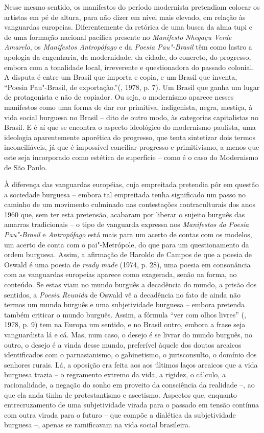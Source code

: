 Nesse mesmo sentido, os manifestos do período modernista pretendiam
colocar os artistas em pé de altura, para não dizer em nível mais
elevado, em relação às vanguardas europeias. Diferentemente da retórica
de uma busca da alma tupi e de uma formação nacional pacífica presente
no \emph{Manifesto} \emph{Nhegaçu Verde Amarelo}, os \emph{Manifestos
Antropófago} e da \emph{Poesia Pau"-Brasil} têm como lastro a apologia da
engenharia, da modernidade, da cidade, do concreto, do progresso, embora
com a tonalidade local, irreverente e questionadora do passado colonial.
A disputa é entre um Brasil que importa e copia, e um Brasil que
inventa, ``Poesia Pau"-Brasil, de exportação.''(, 1978, p. 7). Um
Brasil que ganha um lugar de protagonista e não de copiador. Ou seja, o
modernismo aparece nesses manifestos como uma forma de dar cor
primitiva, indigenista, negra, mestiça, à vida social burguesa no Brasil
-- dito de outro modo, às categorias capitalistas no Brasil. E é aí que
se encontra o aspecto ideológico do modernismo paulista, uma ideologia
aparentemente aporética do progresso, que tenta sintetizar dois termos
inconciliáveis, já que é impossível conciliar progresso e primitivismo,
a menos que este seja incorporado como estética de superfície -- como é
o caso do Modernismo de São Paulo.

À diferença das vanguardas européias, cuja empreitada pretendia pôr em
questão a sociedade burguesa -- embora tal empreitada tenha significado
um passo no caminho de um movimento culminado nas contestações
contraculturais dos anos 1960 que, sem ter esta pretensão, acabaram por
liberar o sujeito burguês das amarras tradicionais -- o tipo de
vanguarda expressa nos \emph{Manifestos da Poesia Pau"-Brasil} e
\emph{Antropófago} está mais para um acerto de contas com os modelos, um
acerto de conta com o pai"-Metrópole, do que para um questionamento da
ordem burguesa. Assim, a afirmação de Haroldo de Campos de que a poesia
de Oswald é uma poesia de \emph{ready} \emph{made} (1974, p. 28), uma
poesia em consonância com as vanguardas europeias aparece como
exagerada, senão na forma, no conteúdo. Se estas viam no mundo burguês a
decadência do mundo, a prisão dos sentidos, a \emph{Poesia Reunida} de
Oswald vê a decadência no fato de ainda não termos um mundo burguês e
uma subjetividade burguesa -- embora pretenda também criticar o mundo
burguês. Assim, a fórmula ``ver com olhos livres'' (, 1978, p. 9)
tem na Europa um sentido, e no Brasil outro, embora a frase seja
vanguardista lá e cá. Mas, num caso, o desejo é se livrar do mundo
burguês, no outro, o desejo é a vinda desse mundo, preferível àquele dos
doutos arcaicos identificados com o parnasianismo, o gabinetismo, o
jurisconsulto, o domínio dos senhores rurais. Lá, a oposição era feita
aos aos últimos laços arcaicos que a vida burguesa trazia -- o
regramento extremo da vida, a rigidez, o cálculo, a racionalidade, a
negação do sonho em proveito da consciência da realidade --, ao que ela
anda tinha de protestantismo e ascetismo. Aspectos que, enquanto
entrecruzamento de uma subjetividade virada para o passado em tensão
contínua com outra virada para o futuro -- que compõe a dialética da
subjetividade burguesa --, apenas se ramificavam na vida social
brasileira.

